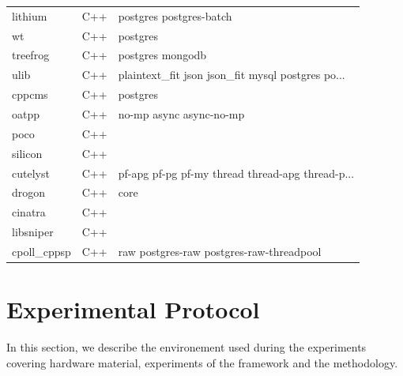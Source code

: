 \begin{longtable}{lll}
    lithium          & C++         & postgres postgres-batch                            \\
    wt               & C++         & postgres                                           \\
    treefrog         & C++         & postgres mongodb                                   \\
    ulib             & C++         & plaintext\_fit json json\_fit mysql postgres po... \\
    cppcms           & C++         & postgres                                           \\
    oatpp            & C++         & no-mp async async-no-mp                            \\
    poco             & C++         &                                                    \\
    silicon          & C++         &                                                    \\
    cutelyst         & C++         & pf-apg pf-pg pf-my thread thread-apg thread-p...   \\
    drogon           & C++         & core                                               \\
    cinatra          & C++         &                                                    \\
    libsniper        & C++         &                                                    \\
    cpoll\_cppsp     & C++         & raw postgres-raw postgres-raw-threadpool           \\
\end{longtable}


\newcommand\duration{20}
\newcommand\parallelclient{512}
\section{Experimental Protocol}

In this section, we describe the environement used during the experiments covering hardware material, experiments of the framework and the methodology.

